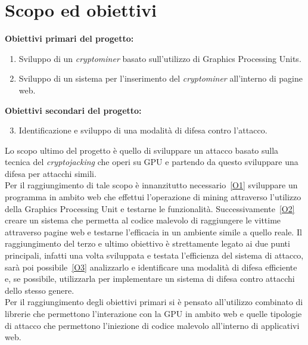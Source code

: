 \documentclass[
11pt, %
oneside, %
italian, %
onehalfspacing,%
headsepline, %
]{MastersDoctoralThesis} %
\begin{document}
{\chapter{Scopo ed obiettivi}}
\textbf{Obiettivi primari del progetto:}
\begin{enumerate}[label= (\roman*)]
        \item\label{O1} Sviluppo di un \emph{cryptominer} basato sull'utilizzo di Graphics Processing Units.
        \item\label{O2} Sviluppo di un sistema per l'inserimento del \emph{cryptominer} all'interno di pagine web.
\end{enumerate}
\textbf{Obiettivi secondari del progetto:}
\begin{enumerate}[label= (\roman*)]
        \setcounter{enumi}{2}
        \item\label{O3} Identificazione e sviluppo di una modalità di difesa contro l'attacco.
\end{enumerate}
Lo scopo ultimo del progetto è quello di sviluppare un attacco basato sulla tecnica del \emph{cryptojacking} che operi su GPU e partendo da questo sviluppare una difesa per attacchi simili.\\
Per il raggiungimento di tale scopo è innanzitutto necessario~\ref{O1} sviluppare un programma in ambito web che effettui l'operazione di mining attraverso l'utilizzo della Graphics Processing Unit e testarne le funzionalità. Successivamente~\ref{O2} creare un sistema che permetta al codice malevolo di raggiungere le vittime attraverso pagine web e testarne l'efficacia in un ambiente simile a quello reale. Il raggiungimento del terzo e ultimo obiettivo è strettamente legato ai due punti principali, infatti una volta sviluppata e testata l'efficienza del sistema di attacco, sarà poi possibile~\ref{O3} analizzarlo e identificare una modalità di difesa efficiente e, se possibile, utilizzarla per implementare un sistema di difesa contro attacchi dello stesso genere.\\
Per il raggiungimento degli obiettivi primari si è pensato all'utilizzo combinato di librerie che permettono l'interazione con la GPU in ambito web e quelle tipologie di attacco che permettono l'iniezione di codice malevolo all'interno di applicativi web.\\
\end{document}
